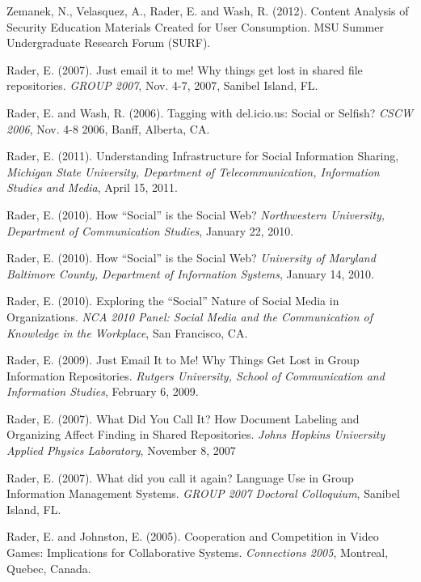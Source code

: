 \documentclass[9pt]{extarticle}
\makeatletter
\renewcommand{\section}{%
  \@startsection{section}{1}{0em}{\baselineskip}{3pt}{\large\bfseries\textsc}}
\makeatother
\begin{document}
Zemanek, N., Velasquez, A., Rader, E. and Wash, R. (2012). Content Analysis of Security Education Materials Created for User Consumption. MSU Summer Undergraduate Research Forum (SURF).
  
Rader, E. (2007). Just email it to me! Why things get lost in shared file repositories. \emph{GROUP 2007}, Nov. 4-7, 2007, Sanibel Island, FL.

Rader, E. and Wash, R. (2006). Tagging with del.icio.us: Social or Selfish? \emph{CSCW 2006}, Nov. 4-8 2006, Banff, Alberta, CA.
 

\section{External Presentations}

Rader, E. (2011). Understanding Infrastructure for Social Information Sharing, \emph{Michigan State University, Department of Telecommunication, Information Studies and Media}, April 15, 2011.

Rader, E. (2010). How ``Social'' is the Social Web? \emph{Northwestern University, Department of Communication Studies}, January 22, 2010.

Rader, E. (2010). How ``Social'' is the Social Web? \emph{University of Maryland Baltimore County, Department of Information Systems}, January 14, 2010.

Rader, E. (2010). Exploring the ``Social'' Nature of Social Media in Organizations. \emph{NCA 2010 Panel: Social Media and the Communication of Knowledge in the Workplace}, San Francisco, CA.

Rader, E. (2009). Just Email It to Me! Why Things Get Lost in Group Information Repositories. \emph{Rutgers University, School of Communication and Information Studies}, February 6, 2009.

Rader, E. (2007). What Did You Call It? How Document Labeling and Organizing Affect Finding in Shared Repositories. \emph{Johns Hopkins University Applied Physics Laboratory}, November 8, 2007

Rader, E. (2007). What did you call it again? Language Use in Group Information Management Systems. \emph{GROUP 2007 Doctoral Colloquium}, Sanibel Island, FL.

Rader, E. and Johnston, E. (2005). Cooperation and Competition in Video Games: Implications for Collaborative Systems. \emph{Connections 2005}, Montreal, Quebec, Canada.
\end{document}
